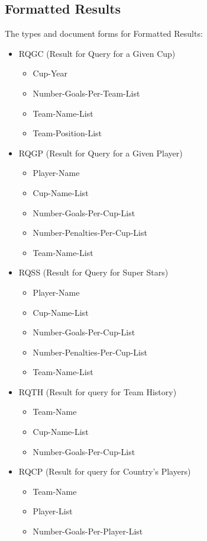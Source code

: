 \documentclass{article}
\begin{document}
\subsection{Formatted Results}
The types and document forms for Formatted Results:
\begin{itemize}
	\label{results}
	\item RQGC (Result for Query for a Given Cup)
	\begin{itemize}
		\item Cup-Year
		\item Number-Goals-Per-Team-List
		\item Team-Name-List
		\item Team-Position-List
	\end{itemize}
	\item RQGP (Result for Query for a Given Player) 
	\begin{itemize}
		\item Player-Name
		\item Cup-Name-List
		\item Number-Goals-Per-Cup-List
		\item Number-Penalties-Per-Cup-List
		\item Team-Name-List
	\end{itemize}
	\item RQSS (Result for Query for Super Stars)
	\begin{itemize}
		\item Player-Name
		\item Cup-Name-List
		\item Number-Goals-Per-Cup-List
		\item Number-Penalties-Per-Cup-List
		\item Team-Name-List
	\end{itemize}
	\item RQTH (Result for query for Team History)
	\begin{itemize}
		\item Team-Name
		\item Cup-Name-List
		\item Number-Goals-Per-Cup-List
	\end{itemize}
	\clearpage
	\item RQCP (Result for query for Country's Players)
		\begin{itemize}
			\item Team-Name
			\item Player-List
			\item Number-Goals-Per-Player-List

\end{itemize}
\end{itemize}
\end{document}
